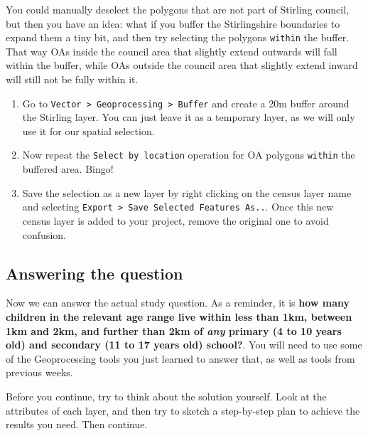 \documentclass[
  letterpaper,
  DIV=11,
  numbers=noendperiod]{scrreprt}
\begin{document}
You could manually deselect the polygons that are not part of Stirling
council, but then you have an idea: what if you buffer the Stirlingshire
boundaries to expand them a tiny bit, and then try selecting the
polygons \texttt{within} the buffer. That way OAs inside the council
area that slightly extend outwards will fall within the buffer, while
OAs outside the council area that slightly extend inward will still not
be fully within it.

\begin{enumerate}
\def\labelenumi{(\arabic{enumi})}
\setcounter{enumi}{286}
\item
  Go to
  \texttt{Vector\ \textgreater{}\ Geoprocessing\ \textgreater{}\ Buffer}
  and create a 20m buffer around the Stirling layer. You can just leave
  it as a temporary layer, as we will only use it for our spatial
  selection.
\item
  Now repeat the \texttt{Select\ by\ location} operation for OA polygons
  \texttt{within} the buffered area. Bingo!
\item
  Save the selection as a new layer by right clicking on the census
  layer name and selecting
  \texttt{Export\ \textgreater{}\ Save\ Selected\ Features\ As..}. Once
  this new census layer is added to your project, remove the original
  one to avoid confusion.
\end{enumerate}

\subsection{Answering the question}\label{answering-the-question}

Now we can answer the actual study question. As a reminder, it is
\textbf{how many children in the relevant age range live within less
than 1km, between 1km and 2km, and further than 2km of \emph{any}
primary (4 to 10 years old) and secondary (11 to 17 years old) school?}.
You will need to use some of the Geoprocessing tools you just learned to
answer that, as well as tools from previous weeks.

\begin{tcolorbox}[enhanced jigsaw, coltitle=black, toprule=.15mm, breakable, opacitybacktitle=0.6, left=2mm, colback=white, leftrule=.75mm, rightrule=.15mm, colbacktitle=quarto-callout-important-color!10!white, toptitle=1mm, titlerule=0mm, colframe=quarto-callout-important-color-frame, arc=.35mm, bottomtitle=1mm, opacityback=0, bottomrule=.15mm, title=\textcolor{quarto-callout-important-color}{\faExclamation}\hspace{0.5em}{Stop and Think}]

Before you continue, try to think about the solution yourself. Look at
the attributes of each layer, and then try to sketch a step-by-step plan
to achieve the results you need. Then continue.

\end{tcolorbox}
\end{document}

